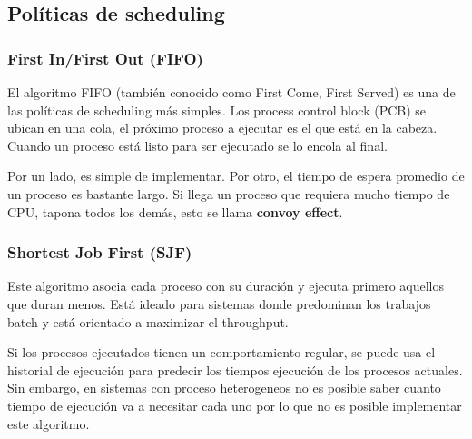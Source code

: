 	\subsection{Políticas de scheduling}
	\subsubsection{First In/First Out (FIFO)}
	El algoritmo FIFO (también conocido como First Come, First Served) es una de las políticas de scheduling más simples. Los process control block (PCB) se ubican en una cola, el próximo proceso a ejecutar es el que está en la cabeza. Cuando un proceso está listo para ser ejecutado se lo encola al final.
	
	Por un lado, es simple de implementar. Por otro, el tiempo de espera promedio de un proceso es bastante largo. Si llega un proceso que requiera mucho tiempo de CPU, tapona todos los demás, esto se llama \textbf{convoy effect}.
	
	\subsubsection{}
	\subsubsection{}
	\subsubsection{Shortest Job First (SJF)}
	Este algoritmo asocia cada proceso con su duración y ejecuta primero aquellos que duran menos. Está ideado para sistemas donde predominan los trabajos batch y está orientado a maximizar el throughput.
	
	Si los procesos ejecutados tienen un comportamiento regular, se puede usa el historial de ejecución para predecir los tiempos ejecución de los procesos actuales. Sin embargo, en sistemas con proceso heterogeneos no es posible saber cuanto tiempo de ejecución va a necesitar cada uno por lo que no es posible implementar este algoritmo.

	\subsection{}

\section{}
